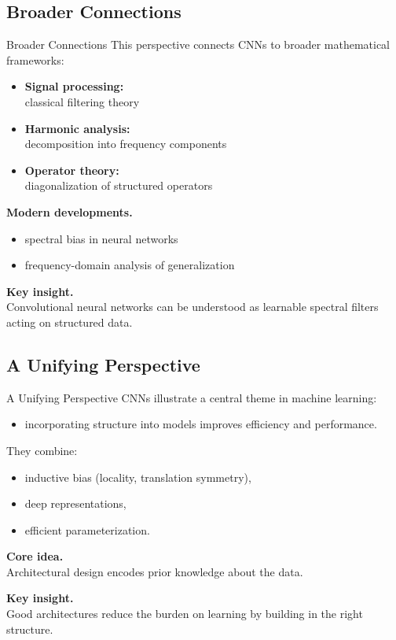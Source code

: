 \documentclass[aspectratio=169,11pt]{beamer}
\begin{document}
\subsection{Broader Connections}
\begin{frame}[t,allowframebreaks]{Broader Connections}
\small
This perspective connects CNNs to broader mathematical frameworks:

\begin{itemize}
    \item \textbf{Signal processing:}\\ classical filtering theory
    \item \textbf{Harmonic analysis:}\\ decomposition into frequency components
    \item \textbf{Operator theory:}\\ diagonalization of structured operators
\end{itemize}

\textbf{Modern developments.}\\ \begin{itemize}
    \item spectral bias in neural networks
    \item frequency-domain analysis of generalization
\end{itemize}

\textbf{Key insight.}\\ Convolutional neural networks can be understood as learnable spectral filters acting on structured data.
\end{frame}

\subsection{A Unifying Perspective}
\begin{frame}[t,allowframebreaks]{A Unifying Perspective}
\small
CNNs illustrate a central theme in machine learning:

\begin{itemize}
    \item incorporating structure into models improves efficiency and performance.
\end{itemize}

They combine:

\begin{itemize}
    \item inductive bias (locality, translation symmetry),
    \item deep representations,
    \item efficient parameterization.
\end{itemize}

\textbf{Core idea.}\\ Architectural design encodes prior knowledge about the data.

\textbf{Key insight.}\\ Good architectures reduce the burden on learning by building in the right structure.
\end{frame}
\end{document}
